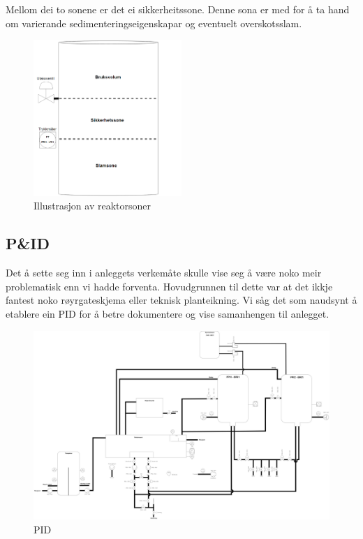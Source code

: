 Mellom dei to sonene er det ei sikkerheitssone.
Denne sona er med for å ta hand om varierande sedimenteringseigenskapar
og eventuelt overskotsslam.\newline

\begin{figure}[htbp]
    \centering
    \includegraphics[width=0.5\textwidth]{Figurar/Reaktorsoner.png}
    \caption{Illustrasjon av reaktorsoner}\label{fig:Reaktorsonar}
\end{figure}

\subsection{P\&ID}

Det å sette seg inn i anleggets verkemåte skulle vise seg å være noko meir problematisk enn vi hadde forventa.
Hovudgrunnen til dette var at det ikkje fantest noko røyrgateskjema eller teknisk planteikning. \newline
Vi såg det som naudsynt å etablere ein \gls{PID} for å betre dokumentere og vise samanhengen til anlegget.

\begin{figure}[htbp]
    \centering
    \includegraphics[angle=90,width=1\textwidth]{Figurar/PID.drawio.png}
    \caption{\gls{PID}}\label{fig:HMI}
\end{figure}